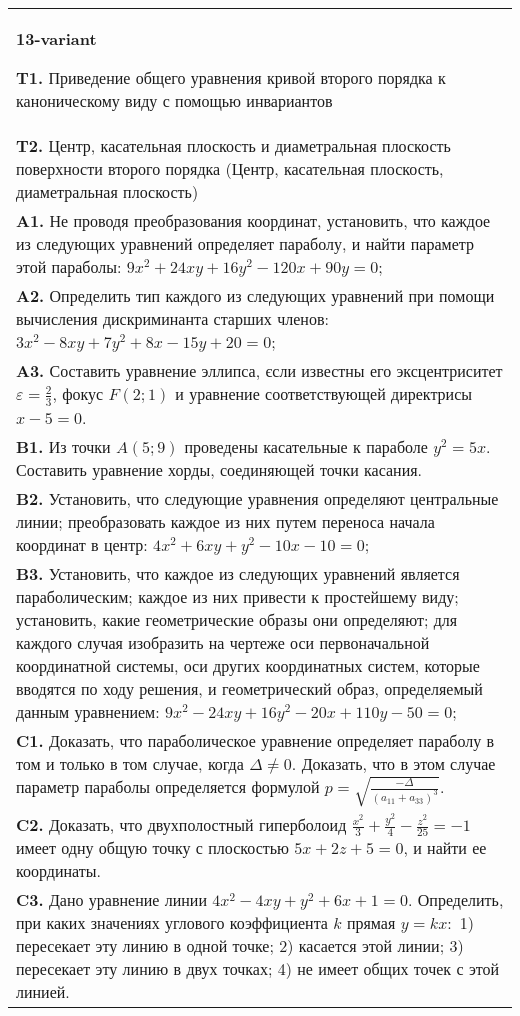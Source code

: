 \documentclass{article}
\begin{document}
\begin{tabular}{m{17cm}}
\textbf{13-variant}
\newline

\textbf{T1.} Приведение общего уравнения кривой второго порядка к каноническому виду с помощью инвариантов \\
\textbf{T2.} Центр, касательная плоскость и диаметральная плоскость поверхности второго порядка (Центр, касательная плоскость, диаметральная плоскость) \\
\textbf{A1.} Не проводя преобразования координат, установить, что каждое из следующих уравнений определяет параболу, и найти параметр этой параболы: $9 x^2+24 x y+16 y^2-120 x+90 y=0$; \\
\textbf{A2.} Определить тип каждого из следующих уравнений при помощи вычисления дискриминанта старших членов: $3 x^2-8 x y+7 y^2+8 x-15 y+20=0$; \\
\textbf{A3.} Составить уравнение эллипса, єсли известны его эксцентриситет $\varepsilon=\frac{2}{3}$, фокус $F(2 ; 1)$ и уравнение соответствующей директрисы $x-5=0$. \\
\textbf{B1.} Из точки $A(5 ; 9)$ проведены касательные к параболе $y^2=5 x$. Составить уравнение хорды, соединяющей точки касания. \\
\textbf{B2.} Установить, что следующие уравнения определяют центральные линии; преобразовать каждое из них путем переноса начала координат в центр: $4 x^2+6 x y+y^2-10 x-10=0$; \\
\textbf{B3.} Установить, что каждое из следующих уравнений является параболическим; каждое из них привести к простейшему виду; установить, какие геометрические образы они определяют; для каждого случая изобразить на чертеже оси первоначальной координатной системы, оси других координатных систем, которые вводятся по ходу решения, и геометрический образ, определяемый данным уравнением: $9 x^2-24 x y+16 y^2-20 x+110 y-50=0$; \\
\textbf{C1.} Доказать, что параболическое уравнение определяет параболу в том и только в том случае, когда $\Delta \neq 0$. Доказать, что в этом случае параметр параболы определяется формулой $p=\sqrt{\frac{-\Delta}{ (a_{11}+a_{33}) ^3}}$. \\
\textbf{C2.} Доказать, что двухполостный гиперболоид $\frac{x^2}{3}+\frac{y^2}{4}-\frac{z^2}{25}=-1$ имеет одну общую точку с плоскостью $5 x+2 z+5=0$, и найти ее координаты. \\
\textbf{C3.} Дано уравнение линии $4 x^2-4 x y+y^2+6 x+1=0$. Определить, при каких значениях углового коэффициента $k$ прямая $y=k x:$ 1) пересекает эту линию в одной точке; 2) касается этой линии; 3) пересекает эту линию в двух точках; 4) не имеет общих точек с этой линией. \\

\end{tabular}
\vspace{1cm}
\end{document}
